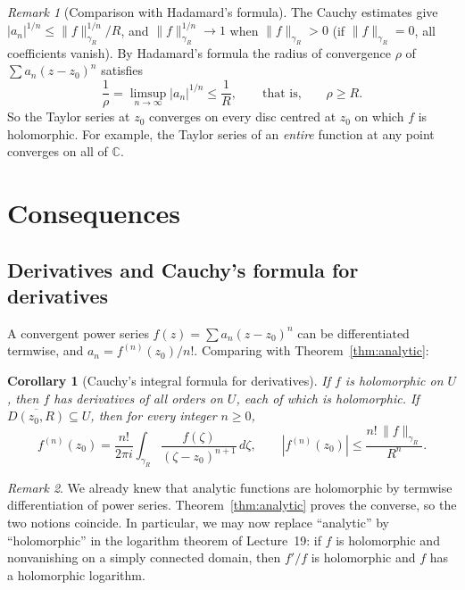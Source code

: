 \documentclass[11pt]{article}
\theoremstyle{plain}
\newtheorem{corollary}[theorem]{Corollary}
\theoremstyle{definition}
\theoremstyle{remark}
\newtheorem*{remark}{Remark}
\numberwithin{equation}{section}
\newcommand{\C}{\mathbb{C}}
\begin{document}
\begin{remark}[Comparison with Hadamard's formula]
The Cauchy estimates give
$|a_n|^{1/n}\leq\|f\|_{\gamma_R}^{1/n}/R$, and
$\|f\|_{\gamma_R}^{1/n}\to1$ when $\|f\|_{\gamma_R}>0$
(if $\|f\|_{\gamma_R}=0$, all coefficients vanish). By Hadamard's formula
the radius of convergence $\rho$ of $\sum a_n(z-z_0)^n$ satisfies
\[
 \frac1\rho=\limsup_{n\to\infty}|a_n|^{1/n}\leq\frac1R,
 \qquad\text{that is,}\qquad \rho\geq R.
\]
So the Taylor series at $z_0$ converges on every disc centred at $z_0$
on which $f$ is holomorphic. For example, the Taylor series of an
\emph{entire} function at any point converges on all of $\C$.
\end{remark}

\section{Consequences}
\subsection{Derivatives and Cauchy's formula for derivatives}
A convergent power series $f(z)=\sum a_n(z-z_0)^n$ can be differentiated
termwise, and $a_n=f^{(n)}(z_0)/n!$. Comparing with
Theorem~\ref{thm:analytic}:

\begin{corollary}[Cauchy's integral formula for derivatives]\label{cor:derivatives}
If $f$ is holomorphic on $U$, then $f$ has derivatives of all orders on
$U$, each of which is holomorphic. If $\overline{D(z_0,R)}\subseteq U$, then
for every integer $n\geq0$,
\[
 \boxed{\displaystyle f^{(n)}(z_0)=\frac{n!}{2\pi i}\int_{\gamma_R}
 \frac{f(\zeta)}{(\zeta-z_0)^{n+1}}\,d\zeta,\qquad
 |f^{(n)}(z_0)|\leq\frac{n!\,\|f\|_{\gamma_R}}{R^n}.}
\]
\end{corollary}

\begin{remark}
We already knew that analytic functions are holomorphic by termwise
differentiation of power series. Theorem~\ref{thm:analytic} proves the
converse, so the two notions coincide. In particular, we may now replace
``analytic'' by ``holomorphic'' in the logarithm theorem of Lecture~19:
if $f$ is holomorphic and nonvanishing on a simply connected domain, then
$f'/f$ is holomorphic and $f$ has a holomorphic logarithm.
\end{remark}
\end{document}
